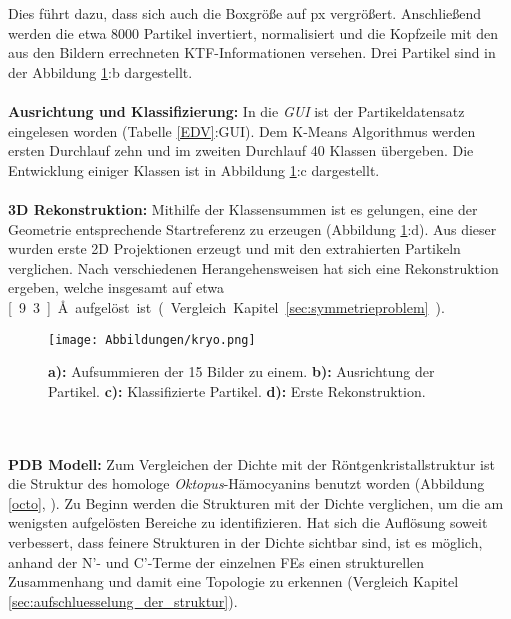 Dies führt dazu, dass sich auch die Boxgröße auf \unit[512]{px} vergrößert.
Anschließend werden die etwa 8000 Partikel invertiert, normalisiert und die Kopfzeile mit den aus den Bildern errechneten KTF-Informationen versehen.
Drei Partikel sind in der Abbildung \ref{kryo_schema}:b dargestellt.
\\
\\
\textbf{Ausrichtung und Klassifizierung:}
In die \textit{GUI} ist der Partikeldatensatz eingelesen worden (Tabelle \ref{EDV}:GUI).
Dem K-Means Algorithmus werden ersten Durchlauf zehn und im zweiten Durchlauf 40 Klassen übergeben.
Die Entwicklung einiger Klassen ist in Abbildung \ref{kryo_schema}:c dargestellt.
\\
\\
\textbf{3D Rekonstruktion:} 
Mithilfe der Klassensummen ist es gelungen, eine der Geometrie entsprechende Startreferenz zu erzeugen (Abbildung \ref{kryo_schema}:d).
Aus dieser wurden erste 2D Projektionen erzeugt und mit den extrahierten Partikeln verglichen.
Nach verschiedenen Herangehensweisen hat sich eine Rekonstruktion ergeben, welche insgesamt auf etwa \unit[9.3]{\AA} aufgelöst ist (Vergleich Kapitel \ref{sec:symmetrieproblem}).
\begin{figure}
	\texttt{[image: Abbildungen/kryo.png]}
	\caption[Kryo: Weg zur ersten Rekonstruktion]{\textbf{a):} Aufsummieren der 15 Bilder zu einem. \textbf{b):} Ausrichtung der Partikel. \textbf{c):} Klassifizierte Partikel. \textbf{d):} Erste Rekonstruktion.}
	\label{kryo_schema}
\end{figure}
\\
\\
\textbf{PDB Modell:}
Zum Vergleichen der Dichte mit der Röntgenkristallstruktur ist die Struktur des homologe \textit{Oktopus}-Hämocyanins benutzt worden (Abbildung \ref{octo}, \cite{pdb}).
Zu Beginn werden die Strukturen mit der Dichte verglichen, um die am wenigsten aufgelösten Bereiche zu identifizieren. 
Hat sich die Auflösung soweit verbessert, dass feinere Strukturen in der Dichte sichtbar sind, ist es möglich, anhand der N'- und C'-Terme der einzelnen FEs einen strukturellen Zusammenhang und damit eine Topologie zu erkennen (Vergleich Kapitel \ref{sec:aufschluesselung_der_struktur}).

\FloatBarrier